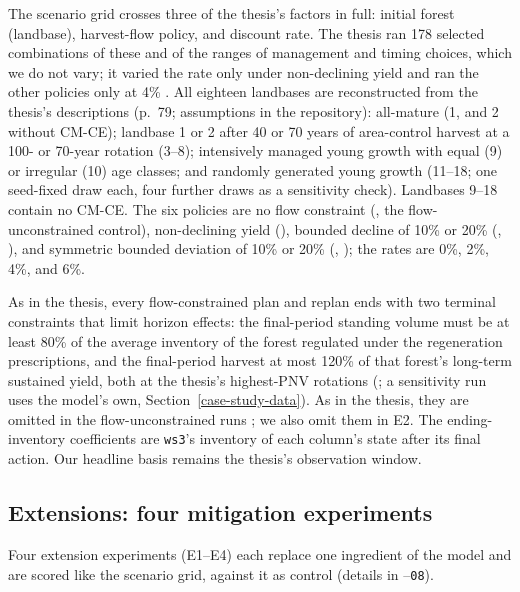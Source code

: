 The scenario grid crosses three of the thesis's factors in full: initial forest (landbase), harvest-flow policy, and discount rate. The thesis ran 178 selected combinations of these and of the ranges of management and timing choices, which we do not vary; it varied the rate only under non-declining yield and ran the other policies only at 4\% \citep[Tables~5.8, 6.1]{daugherty1991credibility}. All eighteen landbases \citep[Table~5.5]{daugherty1991credibility} are reconstructed from the thesis's descriptions (p.~79; assumptions in the repository): all-mature (1, and 2 without CM-CE); landbase 1 or 2 after 40 or 70 years of area-control harvest at a 100- or 70-year rotation (3--8); intensively managed young growth with equal (9) or irregular (10) age classes; and randomly generated young growth (11--18; one seed-fixed draw each, four further draws as a sensitivity check). Landbases 9--18 contain no CM-CE. The six policies \citep[Table~5.6]{daugherty1991credibility} are no flow constraint (, the flow-unconstrained control), non-declining yield (), bounded decline of 10\% or 20\% (, ), and symmetric bounded deviation of 10\% or 20\% (, ); the rates are 0\%, 2\%, 4\%, and 6\%.

As in the thesis, every flow-constrained plan and replan ends with two terminal constraints that limit horizon effects: the final-period standing volume must be at least 80\% of the average inventory of the forest regulated under the regeneration prescriptions, and the final-period harvest at most 120\% of that forest's long-term sustained yield, both at the thesis's highest-PNV rotations (\citealp[p.~77, Table~5.3]{daugherty1991credibility}; a sensitivity run uses the model's own, Section~\ref{case-study-data}). As in the thesis, they are omitted in the flow-unconstrained runs \citep[p.~80]{daugherty1991credibility}; we also omit them in E2. The ending-inventory coefficients are \texttt{ws3}'s inventory of each column's state after its final action. Our headline basis remains the thesis's observation window.

\hypertarget{extensions-four-mitigation-tests}{%
\subsection{Extensions: four mitigation experiments}\label{extensions-four-mitigation-tests}}

Four extension experiments (E1--E4) each replace one ingredient of the model and are scored like the scenario grid, against it as control (details in --\texttt{08}).

